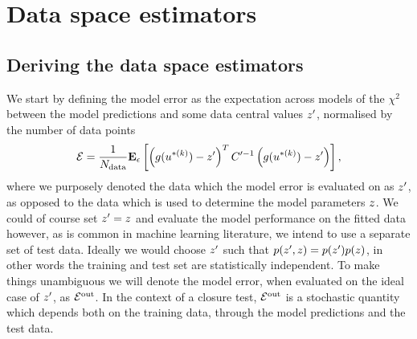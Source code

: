 \section{Data space estimators}

\subsection{Deriving the data space estimators}

We start by defining the model error as the expectation across models of the
$\chi^2$ between the model predictions and some data central values
$z^\prime$, normalised by the number of data points
\begin{equation}\label{eq:chi2kerep}
    \mathcal{E} = \frac{1}{N_{\rm data}} \mathbf{E}_{\epsilon}\left[ 
        \left( g(u^{* (k)}) - z^\prime \right)^T
        C^{\prime -1}
        \left( g(u^{* (k)}) - z^\prime \right)
     \right],
\end{equation}
where we purposely denoted the data which the model error is evaluated on as
$z^\prime$, as opposed to the data which is used to determine the model
parameters $z$. We could of course set $z^\prime = z$ and
evaluate the model performance on the fitted data however, as is common in
machine learning literature, we intend to use a separate set of test data.
Ideally we would choose $z^\prime$ such that $p(z^\prime, z) =
p(z^\prime)p(z)$, in other words the training and test set are
statistically independent. To make things unambiguous we will denote the model
error, when evaluated on the ideal case of $z^\prime$, as $\mathcal{E}^{\rm out}$. In the
context of a closure test, $\mathcal{E}^{\rm out}$ is a stochastic quantity which depends both
on the training data, through the model predictions and the test data.

